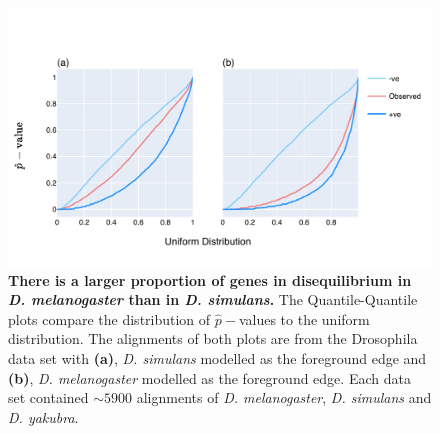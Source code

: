 \begin{figure}[htbp]
\centering
\includegraphics[width=	\textwidth]{figures/plots/drosophila/LRT-QQ.pdf}
\caption{\textbf{There is a larger proportion of genes in disequilibrium in \textit{D. melanogaster} than in \textit{D. simulans}.} The Quantile-Quantile plots compare the distribution of $\hat p-$values to the uniform distribution. The alignments of both plots are from the Drosophila data set with \textbf{(a)}, \textit{D. simulans} modelled as the foreground edge and \textbf{(b)}, \textit{D. melanogaster} modelled as the foreground edge. Each data set contained $\sim 5900$ alignments of \textit{D. melanogaster}, \textit{D. simulans} and \textit{D. yakubra}. }
\label{fig:drosophila_lrt_qq}
\end{figure}
